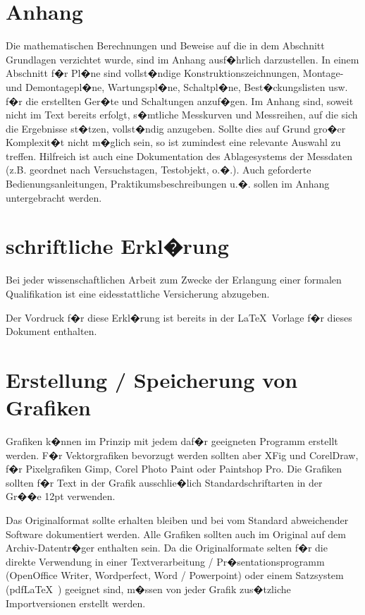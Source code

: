 \section{Anhang}

Die mathematischen Berechnungen und Beweise auf die in dem Abschnitt Grundlagen verzichtet wurde,
sind im Anhang ausf�hrlich darzustellen. In einem Abschnitt f�r Pl�ne sind vollst�ndige
Konstruktionszeichnungen, Montage- und Demontagepl�ne, Wartungspl�ne, Schaltpl�ne,
Best�ckungslisten usw. f�r die erstellten Ger�te und Schaltungen anzuf�gen. Im Anhang sind, soweit
nicht im Text bereits erfolgt, s�mtliche Messkurven und Messreihen, auf die sich die Ergebnisse
st�tzen, vollst�ndig anzugeben. Sollte dies auf Grund gro�er Komplexit�t nicht m�glich sein, so ist
zumindest eine relevante Auswahl zu treffen. Hilfreich ist auch eine Dokumentation des
Ablagesystems der Messdaten (z.B. geordnet nach Versuchstagen, Testobjekt, o.�.). Auch geforderte
Bedienungsanleitungen, Praktikumsbeschreibungen u.�. sollen im Anhang untergebracht werden.



\section{schriftliche Erkl�rung}
Bei jeder wissenschaftlichen Arbeit zum Zwecke der Erlangung einer formalen Qualifikation ist eine eidesstattliche Versicherung
abzugeben.

Der Vordruck f�r diese Erkl�rung ist bereits in der \LaTeX\ Vorlage f�r dieses Dokument enthalten.

\section{Erstellung / Speicherung von Grafiken\label{sec:grafik}}

Grafiken k�nnen im Prinzip mit jedem daf�r geeigneten Programm erstellt werden. F�r Vektorgrafiken
bevorzugt werden sollten aber XFig und CorelDraw, f�r Pixelgrafiken Gimp, Corel Photo Paint oder
Paintshop Pro. Die Grafiken sollten f�r Text in der Grafik ausschlie�lich Standardschriftarten in
der Gr��e 12pt verwenden.

Das Originalformat sollte erhalten bleiben und bei vom Standard abweichender Software dokumentiert
werden. Alle Grafiken sollten auch im Original auf dem Archiv-Datentr�ger enthalten sein. Da die
Originalformate selten f�r die direkte Verwendung in einer Textverarbeitung / Pr�sentationsprogramm
(OpenOffice Writer, Wordperfect, Word / Powerpoint) oder einem Satzsystem (pdf\LaTeX\ )
geeignet sind, m�ssen von jeder Grafik zus�tzliche Importversionen erstellt werden.


